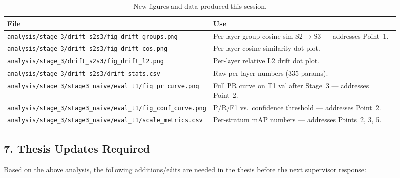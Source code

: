 \begin{table}[h]
\centering
\caption{New figures and data produced this session.}
\small
\begin{tabular}{p{0.40\linewidth}p{0.52\linewidth}}
\hline
\textbf{File} & \textbf{Use} \\
\hline
\texttt{analysis/stage\_3/drift\_s2s3/fig\_drift\_groups.png}
& Per-layer-group cosine sim S2$\to$S3 --- addresses Point~1. \\
\texttt{analysis/stage\_3/drift\_s2s3/fig\_drift\_cos.png}
& Per-layer cosine similarity dot plot. \\
\texttt{analysis/stage\_3/drift\_s2s3/fig\_drift\_l2.png}
& Per-layer relative L2 drift dot plot. \\
\texttt{analysis/stage\_3/drift\_s2s3/drift\_stats.csv}
& Raw per-layer numbers (335 params). \\
\texttt{analysis/stage\_3/stage3\_naive/eval\_t1/fig\_pr\_curve.png}
& Full PR curve on T1 val after Stage~3 --- addresses Point~2. \\
\texttt{analysis/stage\_3/stage3\_naive/eval\_t1/fig\_conf\_curve.png}
& P/R/F1 vs.\ confidence threshold --- addresses Point~2. \\
\texttt{analysis/stage\_3/stage3\_naive/eval\_t1/scale\_metrics.csv}
& Per-stratum mAP numbers --- addresses Points~2, 3, 5. \\
\hline
\end{tabular}
\end{table}

\subsection*{7. Thesis Updates Required}

Based on the above analysis, the following additions/edits are needed
in the thesis before the next supervisor response:

